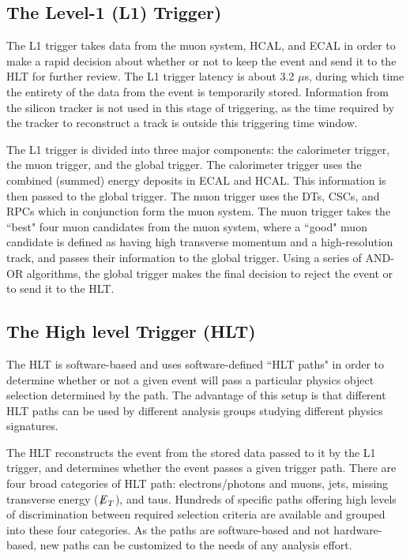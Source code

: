 \subsection{The Level-1 (L1) Trigger)}

The L1 trigger takes data from the muon system, HCAL, and ECAL in order to make a rapid decision about whether or not to keep the event and send it to the HLT for further review. The L1 trigger latency is about 3.2 $\mu$s, during which time the entirety of the data from the event is temporarily stored. Information from the silicon tracker is not used in this stage of triggering, as the time required by the tracker to reconstruct a track is outside this triggering time window. 

The L1 trigger is divided into three major components: the calorimeter trigger, the muon trigger, and the global trigger. The calorimeter trigger uses the combined (summed) energy deposits in ECAL and HCAL. This information is then passed to the global trigger. The muon trigger uses the DTs, CSCs, and RPCs which in conjunction form the muon system. The muon trigger takes the ``best" four muon candidates from the muon system, where a ``good" muon candidate is defined as having high transverse momentum and a high-resolution track, and passes their information to the global trigger. Using a series of AND-OR algorithms, the global trigger makes the final decision to reject the event or to send it to the HLT.

\subsection{The High level Trigger (HLT)}

The HLT is software-based and uses software-defined ``HLT paths" in order to determine whether or not a given event will pass a particular physics object selection determined by the path. The advantage of this setup is that different HLT paths can be used by different analysis groups studying different physics signatures.

The HLT reconstructs the event from the stored data passed to it by the L1 trigger, and determines whether the event passes a given trigger path. There are four broad categories of HLT path: electrons/photons and muons, jets, missing transverse energy (${\not\mathrel{E}}_T$), and taus. Hundreds of specific paths offering high levels of discrimination between required selection criteria are available and grouped into these four categories. As the paths are software-based and not hardware-based, new paths can be customized to the needs of any analysis effort.


